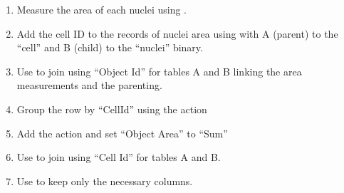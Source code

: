 \begin{enumerate}

    \item Measure the area of each nuclei using .
    
    \item Add the cell ID to the records of nuclei area using  with A (parent) to the ``cell'' and B (child) to the ``nuclei'' binary. 
    
    \item Use  to join using ``Object Id'' for tables A and B linking the area measurements and the parenting.
    
    \item Group the row by ``CellId'' using the action  
    
    \item Add the action  and set ``Object Area'' to ``Sum'' 
    
    \item Use  to join using ``Cell Id'' for tables A and B.
    
    \item Use  to keep only the necessary columns.

\end{enumerate}
